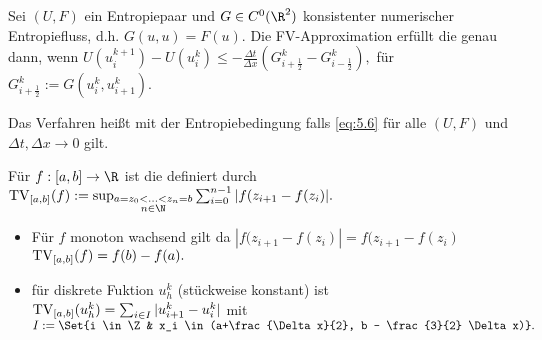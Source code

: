 \begin{df} \label{5.12}
    Sei $(U, F)$ ein Entropiepaar und $G \in C^0(\R^2)$ konsistenter numerischer Entropiefluss, d.h. $G(u,u) = F(u)$.
    Die FV-Approximation erfüllt die  genau dann, wenn
    \begin{math}[numbered] \label{eq:5.6}
        U(u_i^{k+1}) - U(u_i^k)
        \le -\frac{\Delta t}{\Delta x} (G_{i+\frac{1}{2}}^k - G_{i-\frac{1}{2}}^k),
    \end{math}
    für $G_{i+\frac{1}{2}}^k := G(u_i^k, u_{i+1}^k)$.

    Das Verfahren heißt  mit der Entropiebedingung falls \eqref{eq:5.6} für alle $(U,F)$ und $\Delta t, \Delta x \to 0$ gilt.
\end{df}

\begin{df}[Totalvariation] \label{5.13}
    Für $f: [a,b] \to \R$ ist die  definiert durch
    \begin{math}
        \TV_{[a,b]}(f) := \sup_{\substack{a=z_0 < \dotsc < z_n = b \\ n \in \N}} \sum_{i=0}^{n-1} |f(z_{i+1} - f(z_i)|.
    \end{math}
    \begin{note}
        \begin{itemize}
            \item
                Für $f$ monoton wachsend gilt da $|f(z_{i+1} - f(z_i)| = f(z_{i+1} - f(z_i)$
                \begin{math}
                    \operatorname{TV}_{[a,b]}(f) = f(b) - f(a).
                \end{math}
            \item
                für diskrete Fuktion $u_h^k$ (stückweise konstant) ist
                \begin{math}
                    \operatorname{TV}_{[a,b]}(u_h^k) = \sum_{i\in I} |u_{i+1}^k - u_i^k|
                \end{math}
                mit
                \begin{math}
                    I := \Set{i \in \Z & x_i \in (a+\frac{\Delta x}{2}, b - \frac{3}{2} \Delta x)}.
                \end{math}
        \end{itemize}
    \end{note}
\end{df}

